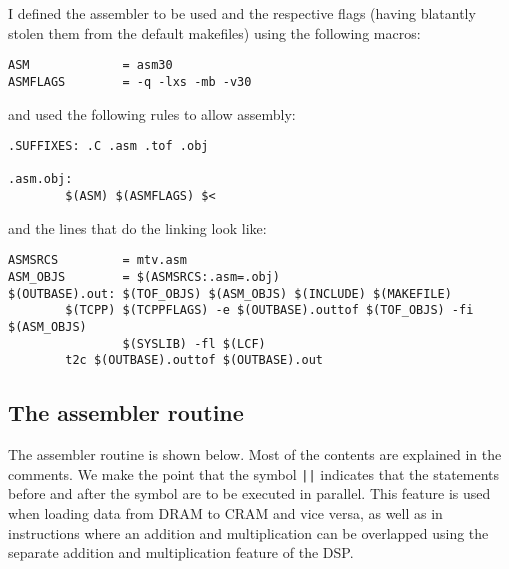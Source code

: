 I defined the assembler to be used and the respective flags (having blatantly
stolen them from the default makefiles) using the following macros:
\begin{verbatim}
ASM             = asm30
ASMFLAGS        = -q -lxs -mb -v30
\end{verbatim}
and used the following rules to allow assembly:
{ \scriptsize
\begin{verbatim}
.SUFFIXES: .C .asm .tof .obj

.asm.obj:
        $(ASM) $(ASMFLAGS) $<
\end{verbatim} }

and the lines that do the linking look like:
{\scriptsize
\begin{verbatim}
ASMSRCS         = mtv.asm
ASM_OBJS        = $(ASMSRCS:.asm=.obj)
$(OUTBASE).out: $(TOF_OBJS) $(ASM_OBJS) $(INCLUDE) $(MAKEFILE) 
        $(TCPP) $(TCPPFLAGS) -e $(OUTBASE).outtof $(TOF_OBJS) -fi $(ASM_OBJS)
                $(SYSLIB) -fl $(LCF)
        t2c $(OUTBASE).outtof $(OUTBASE).out
\end{verbatim} }

\subsection{The assembler routine}
The assembler routine is shown below. Most of the contents are explained
in the comments. We make the point that the symbol {\tt ||} indicates that
the statements before and after the symbol are to be executed in parallel.
This feature is used when loading data from DRAM to CRAM and vice versa,
as well as in instructions where an addition and multiplication can 
be overlapped using the separate addition and multiplication feature
of the DSP.


